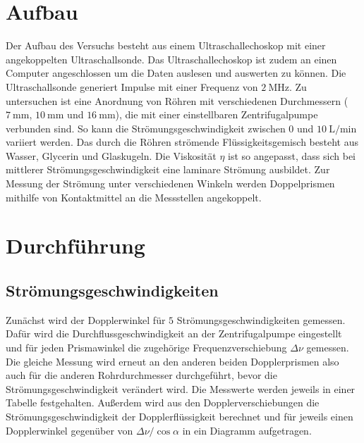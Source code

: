 \section{Aufbau}
\label{sec:Aufbau}
Der Aufbau des Versuchs besteht aus einem Ultraschallechoskop mit einer angekoppelten Ultraschallsonde. Das Ultraschallechoskop
ist zudem an einen Computer angeschlossen um die Daten auslesen und auswerten zu können.
Die Ultraschallsonde generiert Impulse mit einer Frequenz von $\qty{2}{\mega\hertz}$.
Zu untersuchen ist eine Anordnung von Röhren mit verschiedenen Durchmessern ($\qty{7}{\milli\meter}$, $\qty{10}{\milli\meter}$ und $\qty{16}{\milli\meter}$), die mit einer einstellbaren
Zentrifugalpumpe verbunden sind. So kann die Strömungsgeschwindigkeit zwischen $0$ und $\qty{10}{\liter\per\minute}$ variiert werden.
Das durch die Röhren strömende Flüssigkeitsgemisch besteht aus Wasser, Glycerin und Glaskugeln.
Die Viskosität $\eta$ ist so angepasst, dass sich bei mittlerer Strömungsgeschwindigkeit eine laminare Strömung ausbildet.
Zur Messung der Strömung unter verschiedenen Winkeln werden Doppelprismen mithilfe von Kontaktmittel an die Messstellen
angekoppelt.\\

\section{Durchführung}
\label{sec:Durchführung}
\subsection{Strömungsgeschwindigkeiten}
\label{sub:Strömungsgeschwindigkeiten_durch}
Zunächst wird der Dopplerwinkel für $5$ Strömungsgeschwindigkeiten gemessen.
Dafür wird die Durchflussgeschwindigkeit an der Zentrifugalpumpe eingestellt und für jeden Prismawinkel die
zugehörige Frequenzverschiebung $\Delta \nu$ gemessen. 
Die gleiche Messung wird erneut an den anderen beiden Dopplerprismen also auch für die anderen Rohrdurchmesser durchgeführt, bevor die
Strömungsgeschwindigkeit verändert wird.
Die Messwerte werden jeweils in einer Tabelle festgehalten.
Außerdem wird aus den Dopplerverschiebungen die Strömungsgeschwindigkeit der Dopplerflüssigkeit berechnet und 
für jeweils einen Dopplerwinkel gegenüber von $\Delta \nu / \cos{\alpha}$ in ein Diagramm aufgetragen.\\

